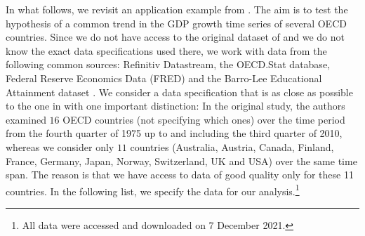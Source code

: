 \documentclass[a4paper,12pt]{article}
\begin{document}
In what follows, we revisit an application example from \cite{Zhang2012}. The aim is to test the hypothesis of a common trend in the GDP growth time series of several OECD countries. Since we do not have access to the original dataset of \cite{Zhang2012} and we do not know the exact data specifications used there, we work with data from the following common sources: Refinitiv Datastream, the OECD.Stat database, Federal Reserve Economics Data (FRED) and the Barro-Lee Educational Attainment dataset \citep*{Barro2013}. We consider a data specification that is as close as possible to the one in \cite{Zhang2012} with one important distinction: In the original study, the authors examined $16$ OECD countries (not specifying which ones) over the time period from the fourth quarter of 1975 up to and including the third quarter of 2010, whereas we consider only $11$ countries (Australia, Austria, Canada, Finland, France, Germany, Japan, Norway, Switzerland, UK and USA) over the same time span. The reason is that we have access to data of good quality only for these 11 countries. 
In the following list, we specify the data for our analysis.\footnote{All data were accessed and downloaded on 7 December 2021.}
\end{document}
